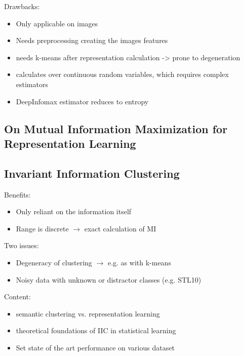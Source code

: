 \documentclass[]{article}
\begin{document}
Drawbacks:
\begin{itemize}
	\item Only applicable on images
	\item Needs preprocessing creating the images features
	\item needs k-means after representation calculation -> prone to degeneration
	\item calculates over continuous random variables, which requires complex estimators
	\item DeepInfomax estimator reduces to entropy
\end{itemize}

\subsection{On Mutual Information Maximization for Representation Learning}

\subsection{Invariant Information Clustering}
Benefits:
\begin{itemize}
	\item Only reliant on the information itself
	\item Range is discrete $\rightarrow$ exact calculation of MI
\end{itemize}
Two issues:
\begin{itemize}
	\item Degeneracy of clustering $\rightarrow$ e.g. as with k-means
	\item Noisy data with unknown or distractor classes (e.g. STL10)
\end{itemize}
Content:
\begin{itemize}
	\item semantic clustering vs. representation learning
	\item theoretical foundations of IIC in statistical learning
\end{itemize}
\begin{itemize}
	\item Set state of the art performance on various dataset
\end{itemize}
\end{document}
